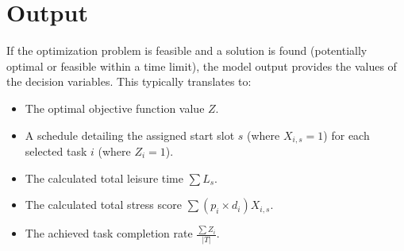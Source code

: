 \documentclass{article}
\begin{document}
\section{Output}

If the optimization problem is feasible and a solution is found (potentially optimal or feasible within a time limit), the model output provides the values of the decision variables. This typically translates to:
\begin{itemize}
    \item The optimal objective function value $Z$.
    \item A schedule detailing the assigned start slot $s$ (where $X_{i,s}=1$) for each selected task $i$ (where $Z_i=1$).
    \item The calculated total leisure time $\sum L_s$.
    \item The calculated total stress score $\sum (p_i \times d_i) X_{i,s}$.
    \item The achieved task completion rate $\frac{\sum Z_i}{|T|}$.
\end{itemize}
\end{document}
